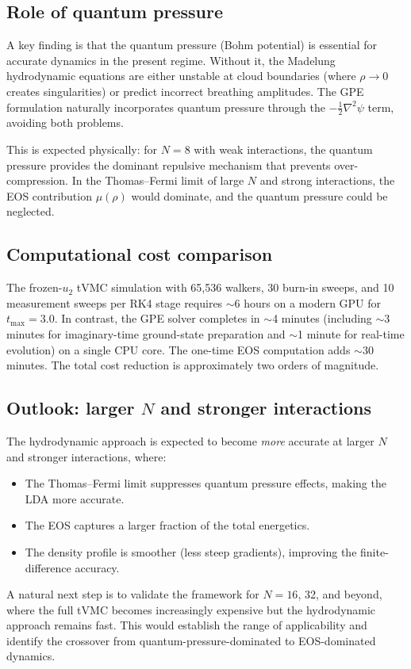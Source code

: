 \documentclass[twocolumn,superscriptaddress,aps,pra,longbibliography]{revtex4-2}
\begin{document}
\subsection{Role of quantum pressure}

A key finding is that the quantum pressure (Bohm potential) is essential
for accurate dynamics in the present regime.  Without it, the Madelung
hydrodynamic equations are either unstable at cloud boundaries (where
$\rho\to 0$ creates singularities) or predict incorrect breathing
amplitudes.  The GPE formulation naturally incorporates quantum pressure
through the $-\frac{1}{2}\nabla^2\psi$ term, avoiding both problems.

This is expected physically: for $N=8$ with weak interactions, the
quantum pressure provides the dominant repulsive mechanism that
prevents over-compression.  In the Thomas--Fermi limit of large $N$
and strong interactions, the EOS contribution $\mu(\rho)$ would dominate,
and the quantum pressure could be neglected.

\subsection{Computational cost comparison}

The frozen-$u_2$ tVMC simulation with 65,536 walkers, 30 burn-in sweeps,
and 10 measurement sweeps per RK4 stage requires $\sim$6 hours on a
modern GPU for $t_{\max}=3.0$.  In contrast, the GPE solver completes
in $\sim$4 minutes (including $\sim$3 minutes for imaginary-time
ground-state preparation and $\sim$1 minute for real-time evolution) on a
single CPU core.  The one-time EOS computation adds $\sim$30 minutes.
The total cost reduction is approximately two orders of magnitude.

\subsection{Outlook: larger $N$ and stronger interactions}

The hydrodynamic approach is expected to become \emph{more} accurate at
larger $N$ and stronger interactions, where:
\begin{itemize}
\item The Thomas--Fermi limit suppresses quantum pressure effects, making
the LDA more accurate.
\item The EOS captures a larger fraction of the total energetics.
\item The density profile is smoother (less steep gradients), improving
the finite-difference accuracy.
\end{itemize}
A natural next step is to validate the framework for $N=16$, 32, and
beyond, where the full tVMC becomes increasingly expensive but the
hydrodynamic approach remains fast.  This would establish the range of
applicability and identify the crossover from quantum-pressure-dominated
to EOS-dominated dynamics.
\end{document}
